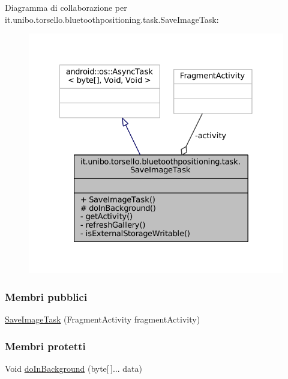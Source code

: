 Diagramma di collaborazione per it.\+unibo.\+torsello.\+bluetoothpositioning.\+task.\+Save\+Image\+Task\+:
\nopagebreak
\begin{figure}[H]
\begin{center}
\leavevmode
\includegraphics[width=328pt]{classit_1_1unibo_1_1torsello_1_1bluetoothpositioning_1_1task_1_1SaveImageTask__coll__graph}
\end{center}
\end{figure}
\subsubsection*{Membri pubblici}
\begin{DoxyCompactItemize}
\item 
\hyperlink{classit_1_1unibo_1_1torsello_1_1bluetoothpositioning_1_1task_1_1SaveImageTask_a73b35fbe1482ff046cc46ce21440824e_a73b35fbe1482ff046cc46ce21440824e}{Save\+Image\+Task} (Fragment\+Activity fragment\+Activity)
\end{DoxyCompactItemize}
\subsubsection*{Membri protetti}
\begin{DoxyCompactItemize}
\item 
Void \hyperlink{classit_1_1unibo_1_1torsello_1_1bluetoothpositioning_1_1task_1_1SaveImageTask_acb2bd5f71fddebe88763fef50932beeb_acb2bd5f71fddebe88763fef50932beeb}{do\+In\+Background} (byte\mbox{[}$\,$\mbox{]}... data)
\end{DoxyCompactItemize}
